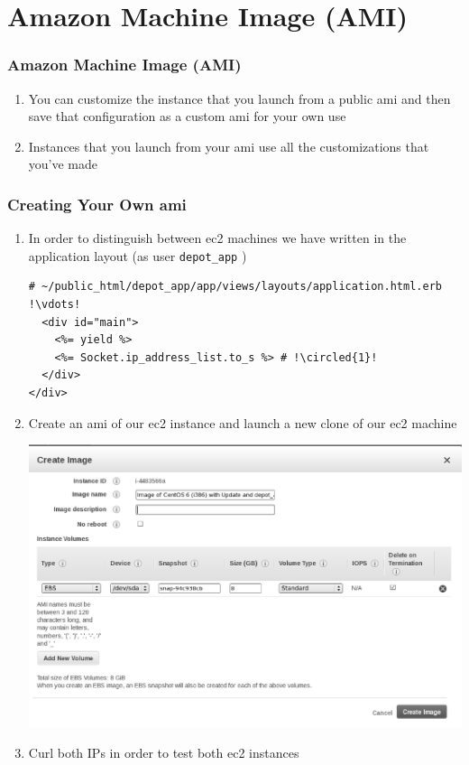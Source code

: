 \documentclass{beamer}
\newcommand*\circled[1]{\tikz[baseline=(char.base)]{
            \node[shape=circle,draw,inner sep=2pt] (char) {#1};}}
\begin{document}
\section{Amazon Machine Image (AMI)}
\begin{frame}
\frametitle{Amazon Machine Image (AMI)}
\begin{enumerate}
\item You can customize the instance that you launch from a public \acrshort{ami} and then save that configuration as a custom \acrshort{ami} for your own use
\item Instances that you launch from your \acrshort{ami} use all the customizations that you've made
\end{enumerate}

\end{frame}
\begin{frame}
\frametitle{Creating Your Own \acrshort{ami}}
\begin{enumerate}
\item In order to distinguish between \acrshort{ec2} machines we have written in the application layout (as user \texttt{depot\_app} )

\lstset{language=html, style=eclipse}
\begin{lstlisting}[escapechar=!]
# ~/public_html/depot_app/app/views/layouts/application.html.erb
!\vdots!
  <div id="main">
    <%= yield %>
    <%= Socket.ip_address_list.to_s %> # !\circled{1}!
  </div>
</div>
\end{lstlisting}

\item Create an \acrshort{ami} of our \acrshort{ec2} instance and launch a new clone of our \acrshort{ec2} machine
\begin{center}
\includegraphics[scale=0.20]{createimage.eps}
\end{center}
\item Curl both IPs in order to test both \acrshort{ec2} instances
\end{enumerate}

\end{frame}
\end{document}
